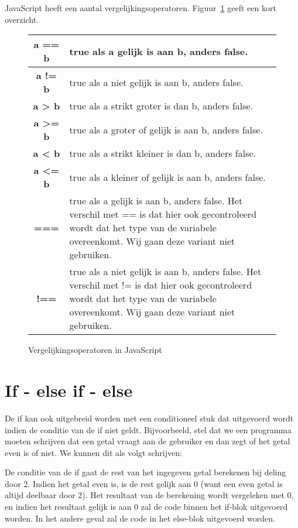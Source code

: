 JavaScript heeft een aantal vergelijkingsoperatoren. Figuur~\ref{tab:compoperators} geeft een kort overzicht.

\begin{figure}
\begin{center}
\begin{tabular}{|c|p{10.5cm}|}
\hline
\textbf{a == b} & true als a gelijk is aan b, anders false. \\
\hline
\textbf{a != b} & true als a niet gelijk is aan b, anders false. \\
\hline
\textbf{a > b} & true als a strikt groter is dan b, anders false. \\
\hline
\textbf{a >= b} & true als a groter of gelijk is aan b, anders false. \\
\hline
\textbf{a < b} & true als a strikt kleiner is dan b, anders false. \\
\hline
\textbf{a <= b} & true als a kleiner of gelijk is aan b, anders false. \\
\hline
\textbf{===} & true als a gelijk is aan b, anders false. Het verschil met == is dat hier ook gecontroleerd wordt dat het type van de variabele overeenkomt. Wij gaan deze variant niet gebruiken. \\
\hline
\textbf{!==} & true als a niet gelijk is aan b, anders false. Het verschil met != is dat hier ook gecontroleerd wordt dat het type van de variabele overeenkomt. Wij gaan deze variant niet gebruiken. \\
\hline
\end{tabular}
\end{center}
\caption{Vergelijkingsoperatoren in JavaScript}\label{tab:compoperators}
\end{figure}

\section{If - else if - else}

De if kan ook uitgebreid worden met een conditioneel stuk dat uitgevoerd wordt indien de conditie van de if niet geldt. Bijvoorbeeld, stel dat we een programma moeten schrijven dat een getal vraagt aan de gebruiker en dan zegt of het getal even is of niet. We kunnen dit als volgt schrijven:


De conditie van de if gaat de rest van het ingegeven getal berekenen bij deling door 2. Indien het getal even is, is de rest gelijk aan 0 (want een even getal is altijd deelbaar door 2). Het resultaat van de berekening wordt vergeleken met 0, en indien het resultaat gelijk is aan 0 zal de code binnen het if-blok uitgevoerd worden. In het andere geval zal de code in het else-blok uitgevoerd worden.

